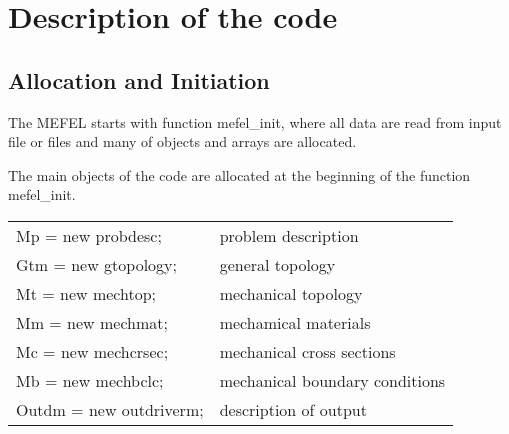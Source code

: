 \chapter{Description of the code}

\section{Allocation and Initiation}

The MEFEL starts with function mefel\_init, where all data are read
from input file or files and many of objects and arrays are allocated.

The main objects of the code are allocated at the beginning
of the function mefel\_init.
\begin{center}
\begin{tabular}{ll}
Mp  = new probdesc;  & problem description
\\
Gtm = new gtopology; & general topology
\\
Mt  = new mechtop; & mechanical topology
\\
Mm  = new mechmat; & mechamical materials
\\
Mc  = new mechcrsec; & mechanical cross sections
\\
Mb  = new mechbclc; & mechanical boundary conditions
\\
Outdm = new outdriverm; & description of output
\end{tabular}
\end{center}

